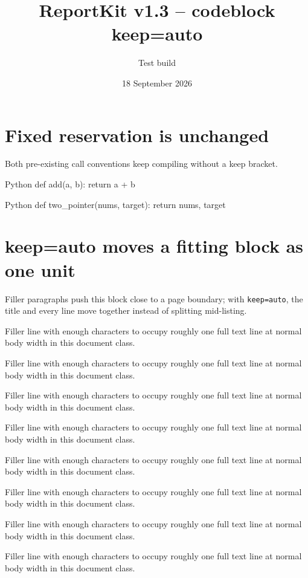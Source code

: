 \documentclass{reportkit}
\title{ReportKit v1.3 -- codeblock keep=auto}
\author{Test build}
\date{18 September 2026}
\begin{document}
\RKFrontMatterBegin
{}
\RKMainMatterBegin

\section{Fixed reservation is unchanged}
Both pre-existing call conventions keep compiling without a keep bracket.

\begin{codeblock}{Python}
def add(a, b):
    return a + b
\end{codeblock}

\begin{codeblock}{Python}
def two_pointer(nums, target):
    return nums, target
\end{codeblock}

\section{keep=auto moves a fitting block as one unit}
Filler paragraphs push this block close to a page boundary; with
\texttt{keep=auto}, the title and every line move together instead of
splitting mid-listing.

Filler line with enough characters to occupy roughly one full text line at normal body width in this document class.

Filler line with enough characters to occupy roughly one full text line at normal body width in this document class.

Filler line with enough characters to occupy roughly one full text line at normal body width in this document class.

Filler line with enough characters to occupy roughly one full text line at normal body width in this document class.

Filler line with enough characters to occupy roughly one full text line at normal body width in this document class.

Filler line with enough characters to occupy roughly one full text line at normal body width in this document class.

Filler line with enough characters to occupy roughly one full text line at normal body width in this document class.

Filler line with enough characters to occupy roughly one full text line at normal body width in this document class.
\end{document}
